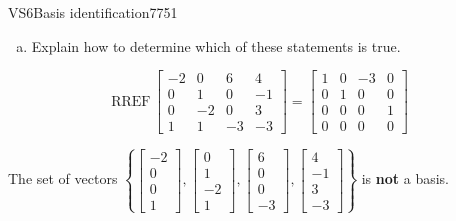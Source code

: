 \begin{exercise}{VS6}{Basis identification}{7751}
\begin{exerciseStatement}
\begin{enumerate}[(a)]
\begin{itemize}
 
\end{itemize}

     
\item  

 Explain how to determine which of these statements is true. 

 
\end{enumerate}

     \end{exerciseStatement}
 \begin{exerciseAnswer} 

 \[
\mathrm{RREF}\, \left[\begin{array}{cccc}
-2 & 0 & 6 & 4 \\
0 & 1 & 0 & -1 \\
0 & -2 & 0 & 3 \\
1 & 1 & -3 & -3
\end{array}\right] = \left[\begin{array}{cccc}
1 & 0 & -3 & 0 \\
0 & 1 & 0 & 0 \\
0 & 0 & 0 & 1 \\
0 & 0 & 0 & 0
\end{array}\right]
            \] 

 

 The set of vectors \(\left\{ \left[\begin{array}{c}
-2 \\
0 \\
0 \\
1
\end{array}\right] , \left[\begin{array}{c}
0 \\
1 \\
-2 \\
1
\end{array}\right] , \left[\begin{array}{c}
6 \\
0 \\
0 \\
-3
\end{array}\right] , \left[\begin{array}{c}
4 \\
-1 \\
3 \\
-3
\end{array}\right] \right\}\) is \textbf{not} a basis. 

 \end{exerciseAnswer}
 \end{exercise}


